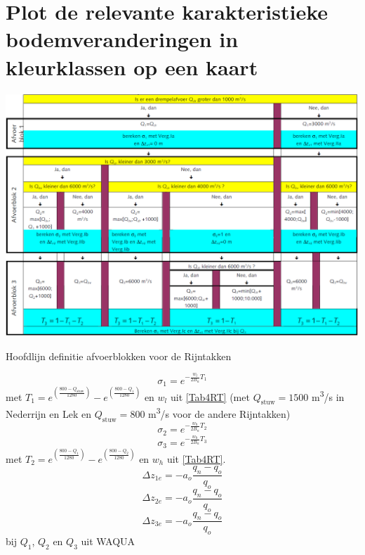 \begin{enumerate}
\end{enumerate}

\section{Plot de relevante karakteristieke bodemveranderingen in kleurklassen op een kaart}

\begin{table}
\includegraphics[width=\columnwidth]{figures/Tab7.png}
\caption{Hoofdlijn definitie afvoerblokken voor de Rijntakken}
\label{Tab7}
\end{table}

\begin{equation}
\sigma_1 = e^{-\frac{w_l}{2 B_n} T_1}
\end{equation}
met $T_1 = e^{\left ( \frac{800-Q_\text{stuw}}{1280} \right )} - e^{\left ( \frac{800-Q_1}{1280} \right )}$ en $w_l$ uit \autoref{Tab4RT} (met $Q_\text{stuw} = 1500$ m\textsuperscript{3}/s in Nederrijn en Lek en $Q_\text{stuw} = 800$ m\textsuperscript{3}/s voor de andere Rijntakken)
%
\begin{equation}
\sigma_2 = e^{-\frac{w_h}{2 B_n} T_2}
\end{equation}
%
\begin{equation}
\sigma_3 = e^{-\frac{w_h}{2 B_n} T_3}
\end{equation}
met $T_2 = e^{\left ( \frac{800-Q_1}{1280} \right )} - e^{\left ( \frac{800-Q_2}{1280} \right )}$ en $w_h$ uit \autoref{Tab4RT}.
%
\begin{equation}
\Delta z_{1e} = -a_o \frac{q_n - q_o}{q_o}
\end{equation}
%
\begin{equation}
\Delta z_{2e} = -a_o \frac{q_n - q_o}{q_o}
\end{equation}
%
\begin{equation}
\Delta z_{3e} = -a_o \frac{q_n - q_o}{q_o}
\end{equation}
bij $Q_1$, $Q_2$ en $Q_3$ uit WAQUA

